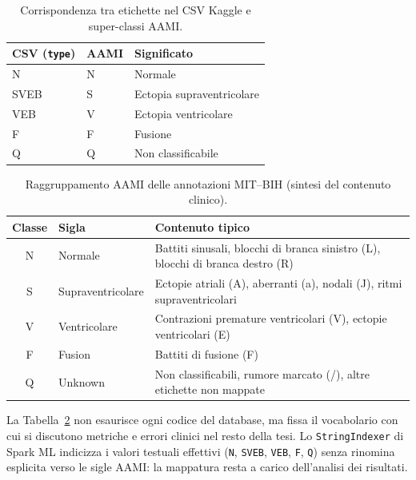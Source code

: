 \begin{table}[H]
  \centering
  \caption{Corrispondenza tra etichette nel CSV Kaggle e super-classi AAMI.}
  \label{tab:aami-csv-mapping}
  \begin{tabular}{@{}lll@{}}
    \toprule
    \textbf{CSV (\texttt{type})} & \textbf{AAMI} & \textbf{Significato} \\
    \midrule
    N    & N & Normale \\
    SVEB & S & Ectopia supraventricolare \\
    VEB  & V & Ectopia ventricolare \\
    F    & F & Fusione \\
    Q    & Q & Non classificabile \\
    \bottomrule
  \end{tabular}
\end{table}

\begin{table}[H]
  \centering
  \caption{Raggruppamento AAMI delle annotazioni MIT--BIH (sintesi del contenuto clinico).}
  \label{tab:aami-mapping}
  \begin{tabular}{@{}clp{7.5cm}@{}}
    \toprule
    \textbf{Classe} & \textbf{Sigla} & \textbf{Contenuto tipico} \\
    \midrule
    N & Normale & Battiti sinusali, blocchi di branca sinistro (L), blocchi di branca destro (R) \\
    S & Supraventricolare & Ectopie atriali (A), aberranti (a), nodali (J), ritmi supraventricolari \\
    V & Ventricolare & Contrazioni premature ventricolari (V), ectopie ventricolari (E) \\
    F & Fusion & Battiti di fusione (F) \\
    Q & Unknown & Non classificabili, rumore marcato (/), altre etichette non mappate \\
    \bottomrule
  \end{tabular}
\end{table}

La Tabella~\ref{tab:aami-mapping} non esaurisce ogni codice del database, ma fissa il vocabolario con cui si discutono metriche e errori clinici nel resto della tesi.
Lo \texttt{StringIndexer} di Spark ML indicizza i valori testuali effettivi (\texttt{N}, \texttt{SVEB}, \texttt{VEB}, \texttt{F}, \texttt{Q}) senza rinomina esplicita verso le sigle AAMI: la mappatura resta a carico dell'analisi dei risultati.

